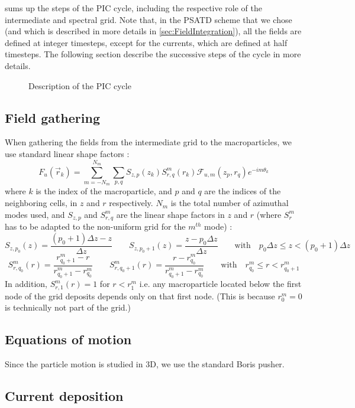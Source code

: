 \documentclass[a4paper]{article}   	%
\begin{document}
 sums up the steps of the PIC cycle, including the
respective role of the intermediate and spectral grid. Note that, in the PSATD
scheme that we chose (and which is described in more details in
\cref{sec:FieldIntegration}), all the fields are defined at integer
timesteps, except for the currents, which are defined at half
timesteps. The following section describe the successive steps of the cycle in more details.

\begin{figure}

\caption{Description of the PIC cycle \label{fig:GlobalScheme}}
\end{figure}

\subsection{Field gathering}

When gathering the fields from the intermediate grid to the macroparticles,
we use standard linear shape factors :
\[ F_u(\vec{r}_k) = \sum_{m=-N_m}^{N_m} \sum_{p,q} S_{z,p}(z_k)
S^m_{r,q}(r_k) \mathcal{F}_{u,m}(z_p, r_q) e^{-im\theta_k} \]
where $k$ is the index of the macroparticle, and $p$ and $q$ are the
indices of the neighboring cells, in $z$ and $r$ respectively. $N_m$ is the total number
of azimuthal modes used, and $S_{z,p}$ and $S^m_{r,q}$ are the linear
shape factors in $z$ and $r$ (where $S^m_r$ has to be adapted to the
non-uniform grid for the $m^{th}$ mode) :
\[ S_{z,p_0}(z) = \frac{(p_0+1)\Delta z - z}{\Delta z}  \qquad 
S_{z, p_0 +1}(z) = \frac{ z - p_0 \Delta z}{\Delta z} \qquad
\mathrm{with} \quad p_0 \Delta z \leq z < (p_0 +1) \Delta z \]
\[ S^m_{r,q_0}(r) = \frac{ r^m_{q_0+1} - r }{  r^m_{q_0+1} - r^m_{q_0} }
\qquad S^m_{r,q_0+1}(r) = \frac{ r - r^m_{q_0} }{  r^m_{q_0+1} - r^m_{q_0} }
\qquad \mathrm{with} \quad r^m_{q_0} \leq r < r^m_{q_0+1} \]
In addition, $S^m_{r,1}(r) = 1$ for $r<r^m_1$ i.e. any macroparticle
located below the first node of the grid deposits depends only on that
first node. (This is because $r^m_0=0$ is technically not part of the grid.)

\subsection{Equations of motion}

Since the particle motion is studied in 3D, we use the standard Boris pusher.

\subsection{Current deposition}
\end{document}
